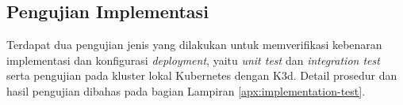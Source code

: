 \subsection{Pengujian Implementasi}

Terdapat dua pengujian jenis yang dilakukan untuk memverifikasi kebenaran implementasi dan konfigurasi \textit{deployment}, yaitu \textit{unit test} dan \textit{integration test} serta pengujian pada kluster lokal Kubernetes dengan K3d. Detail prosedur dan hasil pengujian dibahas pada bagian Lampiran \ref{apx:implementation-test}.
